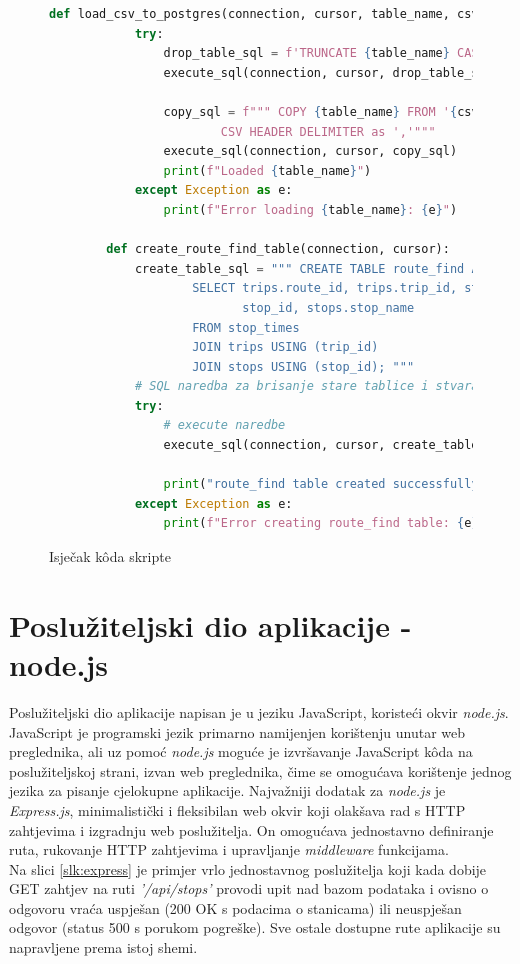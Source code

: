 \documentclass[zavrsnirad]{fer}
\begin{document}
\begin{figure}[H]
	\centering
	\begin{minipage}{0.9\linewidth}
		\begin{lstlisting}[language=Python]
		def load_csv_to_postgres(connection, cursor, table_name, csv_file_path):
			try:
				drop_table_sql = f'TRUNCATE {table_name} CASCADE;'
				execute_sql(connection, cursor, drop_table_sql)

				copy_sql = f""" COPY {table_name} FROM '{csv_file_path}' WITH
						CSV HEADER DELIMITER as ','"""
				execute_sql(connection, cursor, copy_sql)
				print(f"Loaded {table_name}")
			except Exception as e:
				print(f"Error loading {table_name}: {e}")

		def create_route_find_table(connection, cursor):
			create_table_sql = """ CREATE TABLE route_find AS
					SELECT trips.route_id, trips.trip_id, stop_times.stop_sequence,
						   stop_id, stops.stop_name
					FROM stop_times
					JOIN trips USING (trip_id)
					JOIN stops USING (stop_id); """
			# SQL naredba za brisanje stare tablice i stvaranje indeksa
			try:
				# execute naredbe
				execute_sql(connection, cursor, create_table_sql)

				print("route_find table created successfully.")
			except Exception as e:
				print(f"Error creating route_find table: {e}")
		\end{lstlisting}
	\end{minipage}
	\caption{Isječak k\^oda skripte}
	\label{slk:pytonskripta}
\end{figure}
\newpage
\section{Poslužiteljski dio aplikacije - node.js}
Poslužiteljski dio aplikacije napisan je u jeziku JavaScript, koristeći okvir \textit{node.js}. JavaScript je programski jezik primarno namijenjen korištenju unutar web preglednika, ali uz pomoć \textit{node.js} moguće je izvršavanje JavaScript k\^oda na poslužiteljskoj strani, izvan web preglednika, čime se omogućava korištenje jednog jezika za pisanje cjelokupne aplikacije. Najvažniji dodatak za \textit{node.js} je \textit{Express.js}, minimalistički i fleksibilan web okvir koji olakšava rad s HTTP zahtjevima i izgradnju web poslužitelja. On omogućava jednostavno definiranje ruta, rukovanje HTTP zahtjevima i upravljanje \textit{middleware} funkcijama.\\
Na slici \ref{slk:express} je primjer vrlo jednostavnog poslužitelja koji kada dobije GET zahtjev na ruti \textit{'/api/stops'} provodi upit nad bazom podataka i ovisno o odgovoru vraća uspješan (200 OK s podacima o stanicama) ili neuspješan odgovor (status 500 s porukom pogreške). Sve ostale dostupne rute aplikacije su napravljene prema istoj shemi.
\end{document}
